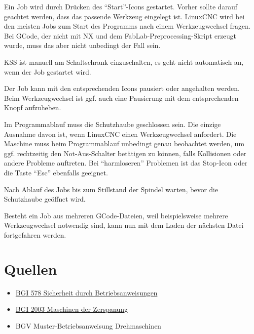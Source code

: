 \documentclass{\basedir/fablab-document}
\begin{document}
Ein Job wird durch Drücken des \enquote{Start}-Icons gestartet. Vorher sollte darauf geachtet werden,
dass das passende Werkzeug eingelegt ist. LinuxCNC wird bei den meisten Jobs zum Start des Programms nach einem Werkzeugwechsel fragen. Bei GCode, der nicht mit NX und dem FabLab-Preprocessing-Skript erzeugt wurde, muss das aber nicht unbedingt der Fall sein.

KSS ist manuell am Schaltschrank einzuschalten, es geht nicht automatisch an, wenn der Job gestartet wird.

Der Job kann mit den entsprechenden Icons pausiert oder angehalten werden. Beim Werkzeugwechsel ist ggf. auch eine Pausierung mit dem entsprechenden Knopf aufzuheben.

Im Programmablauf muss die Schutzhaube geschlossen sein. Die einzige Ausnahme davon ist, wenn LinuxCNC einen Werkzeugwechsel anfordert. Die Maschine muss beim Programmablauf unbedingt genau beobachtet werden, um ggf. rechtzeitig den Not-Aus-Schalter betätigen zu können, falls Kollisionen oder andere Probleme auftreten. Bei \enquote{harmloseren} Problemen ist das Stop-Icon oder die Taste \enquote{Esc} ebenfalls geeignet.

Nach Ablauf des Jobs bis zum Stillstand der Spindel warten, bevor die Schutzhaube geöffnet wird.

Besteht ein Job aus mehreren GCode-Dateien, weil beispielsweise mehrere Werkzeugwechsel notwendig sind, kann nun mit dem Laden der nächsten Datei fortgefahren werden.

\appendix

\section{Quellen}
\begin{itemize}
 \item \href{http://publikationen.dguv.de/dguv/pdf/10002/bgi578.pdf}{BGI 578 Sicherheit durch Betriebsanweisungen}
 \item \href{http://www.arbeitssicherheit.de/media/pdfs/CCC_1290.pdf}{BGI 2003 Maschinen der Zerspanung}
 \item BGV Muster-Betriebsanweisung Drehmaschinen
\end{itemize}

\end{document}
